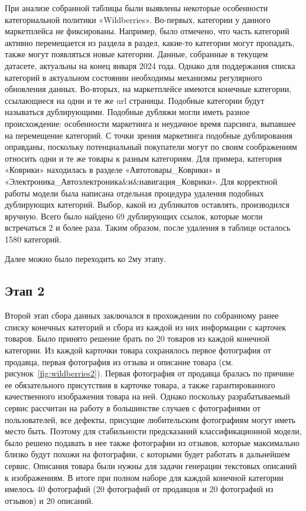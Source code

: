 \documentclass[a4paper,12pt]{extarticle}
\begin{document}
При анализе собранной таблицы были выявлены некоторые особенности категориальной политики «Wildberries». Во-первых, категории у данного маркетплейса не фиксированы. Например, было отмечено, что часть категорий активно перемещается из раздела в раздел, какие-то категории могут пропадать, также могут появляться новые категории. Данные, собранные в текущем датасете, актуальны на конец января 2024 года. Однако для поддержания списка категорий в актуальном состоянии необходимы механизмы регулярного обновления данных. Во-вторых, на маркетплейсе имеются конечные категории, ссылающиеся на одни и те же url страницы. Подобные категории будут называться дублирующими. Подобные дубляжи могли иметь разное происхождение: особенности маркетинга и неудачное время парсинга, выпавшее на перемещение категорий. С точки зрения маркетинга подобные дублирования оправданы, поскольку потенциальный покупатели могут по своим соображениям относить одни и те же товары к разным категориям. Для примера, категория «Коврики» находилась в разделе «Автотовары\_Коврики» и «Электроника\_Автоэлектроника\&и\&навигация\_Коврики». Для корректной работы модели была написана отдельная процедура удаления подобных дублирующих категорий. Выбор, какой из дубликатов оставлять, производился вручную. Всего было найдено 69 дублирующих ссылок, которые могли встречаться 2 и более раза. Таким образом, после удаления в таблице осталось 1580 категорий.

Далее можно было переходить ко 2му этапу.


\subsection{Этап 2}\label{subsection:datastep2}

Второй этап сбора данных заключался в прохождении по собранному ранее списку конечных категорий и сбора из каждой из них информации с карточек товаров. Было принято решение брать по 20 товаров из каждой конечной категории. Из каждой карточки товара сохранялось первое фотография от продавца, первая фотография из отзыва и описание товара (см. рисунок~\ref{fig:wildberries2}). Первая фотография от продавца бралась по причине ее обязательного присутствия в карточке товара, а также гарантированного качественного изображения товара на ней. Однако поскольку разрабатываемый сервис рассчитан на работу в большинстве случаев с фотографиями от пользователей, все дефекты, присущие любительским фотографиям могут иметь место быть. Поэтому для стабильности предсказаний классификационной модели, было решено подавать в нее также фотографии из отзывов, которые максимально близко будут похожи на фотографии, с которыми будет работать в дальнейшем сервис. Описания товара были нужны для задачи генерации текстовых описаний к изображениям. В итоге при полном наборе для каждой конечной категории имелось 40 фотографий (20 фотографий от продавцов и 20 фотографий из отзывов) и 20 описаний.
\end{document}
